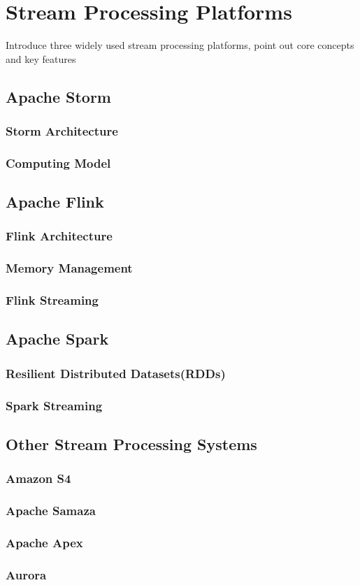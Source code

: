 \chapter{Stream Processing Platforms}
Introduce three widely used stream processing platforms, point out core concepts and key features 

\section{Apache Storm}
\subsection{Storm Architecture}
\subsection{Computing Model}

\section{Apache Flink}
\subsection{Flink Architecture}
\subsection{Memory Management}
\subsection{Flink Streaming}


\section{Apache Spark}
\subsection{ Resilient Distributed Datasets(RDDs)}
\subsection{Spark Streaming}

\section{Other Stream Processing Systems}
\subsection{Amazon S4}
\subsection{Apache Samaza}
\subsection{Apache Apex}
\subsection{Aurora}
\clearpage